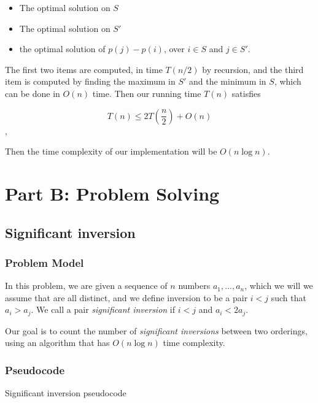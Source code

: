 \documentclass{article}
\begin{document}
\begin{itemize}
 \item The optimal solution on $S$
 \item The optimal solution on $S'$
 \item the optimal solution of $p(j)-p(i)$, over $i \in S$ and $j \in S'$.
\end{itemize}

The first two items are computed, in time $T(n/2)$ by recursion, and the third item is computed by finding the maximum in $S'$ and the minimum in $S$, which can be done in $O(n)$ time. Then our running time $T(n)$ satisfies

$$T(n) \leq 2T(\frac{n}{2})+O(n)$$,

Then the time complexity of our implementation will be $O(n\log n)$.


\section*{Part B: Problem Solving}

\subsection*{Significant inversion}

\subsubsection*{Problem Model}

In this problem, we are given a sequence of $n$ numbers $a_1,...,a_n$, which we will we assume that are all distinct, and we define inversion to be a pair $i<j$ such that $a_i>a_j$. We call a pair \textit{significant inversion} if $i<j$ and $a_i<2a_j$.

Our goal is to count the number of \textit{significant inversions} between two orderings, using an algorithm that has $O(n \log n)$ time complexity.

\subsubsection*{Pseudocode}

\begin{algorithm}[H]
\caption{Significant inversion pseudocode}
\begin{algorithmic}[1]
\end{algorithmic}
\end{algorithm}
\end{document}
